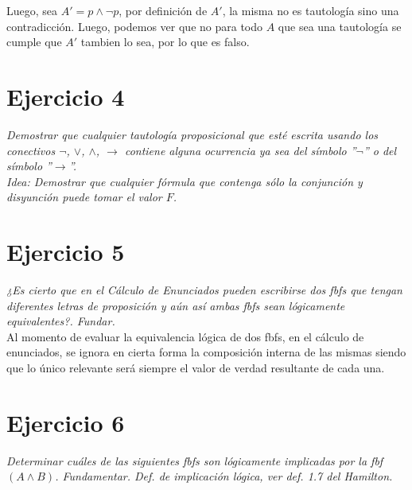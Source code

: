 \documentclass[osajnl,twocolumn,showpacs,superscriptaddress,10pt]{revtex4-1} %
\begin{document}
Luego, sea $A' = p \wedge \neg p$, por definición de $A'$, la misma no es tautología sino una contradicción. Luego, podemos ver que no para todo $A$ que sea una tautología se cumple que $A'$ tambien lo sea, por lo que es falso. \\

\section{Ejercicio 4}

\textit{Demostrar que cualquier tautología proposicional que esté escrita usando los conectivos $\neg$, $\vee$, $\wedge$, $\rightarrow$ contiene alguna ocurrencia ya sea del símbolo ”$\neg$” o del símbolo ”$\rightarrow$”.} \\

\textit{Idea: Demostrar que cualquier fórmula que contenga sólo la conjunción y disyunción puede tomar el valor $F$.} \\



\section{Ejercicio 5}

\textit{¿Es cierto que en el Cálculo de Enunciados pueden escribirse dos fbfs que tengan diferentes letras de proposición y aún así ambas fbfs sean lógicamente equivalentes?. Fundar.} \\

Al momento de evaluar la equivalencia lógica de dos fbfs, en el cálculo de enunciados, se ignora en cierta forma la composición interna de las mismas siendo que lo único relevante será siempre el valor de verdad resultante de cada una.

\newpage

\section{Ejercicio 6}

\textit{Determinar cuáles de las siguientes fbfs son lógicamente implicadas por la fbf $(A \wedge B)$. Fundamentar. Def. de implicación lógica, ver def. 1.7 del Hamilton.} \\
\end{document}
